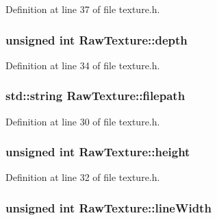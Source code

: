 Definition at line 37 of file texture.\+h.

\hypertarget{class_raw_texture_abfd4db2756cc368282a55b1a6f8fc566}{}
\subsubsection[{depth}]{\setlength{\rightskip}{0pt plus 5cm}unsigned int Raw\+Texture\+::depth\hspace{0.3cm}{\ttfamily [protected]}}\label{class_raw_texture_abfd4db2756cc368282a55b1a6f8fc566}


Definition at line 34 of file texture.\+h.

\hypertarget{class_raw_texture_a0f5f0ecaf7fd35c4fba96462d760aa0b}{}
\subsubsection[{filepath}]{\setlength{\rightskip}{0pt plus 5cm}std\+::string Raw\+Texture\+::filepath\hspace{0.3cm}{\ttfamily [protected]}}\label{class_raw_texture_a0f5f0ecaf7fd35c4fba96462d760aa0b}


Definition at line 30 of file texture.\+h.

\hypertarget{class_raw_texture_ac5e37bde9f359cb9676891d8636e75d0}{}
\subsubsection[{height}]{\setlength{\rightskip}{0pt plus 5cm}unsigned int Raw\+Texture\+::height\hspace{0.3cm}{\ttfamily [protected]}}\label{class_raw_texture_ac5e37bde9f359cb9676891d8636e75d0}


Definition at line 32 of file texture.\+h.

\hypertarget{class_raw_texture_a2bdb867781ad732469c7d03d9ce46f55}{}
\subsubsection[{line\+Width}]{\setlength{\rightskip}{0pt plus 5cm}unsigned int Raw\+Texture\+::line\+Width\hspace{0.3cm}{\ttfamily [protected]}}\label{class_raw_texture_a2bdb867781ad732469c7d03d9ce46f55}


